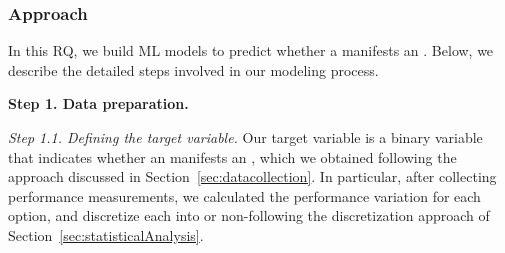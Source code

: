\subsubsection*{Approach}

In this RQ, we build ML models to predict whether a \instance manifests an \inconsistent. %
Below, we describe the detailed steps involved in our modeling process.

\noindent\textbf{Step 1. Data preparation.}

\textit{Step 1.1. Defining the target variable.} Our target variable is a binary variable that indicates whether an \instance manifests an \inconsistent, which we obtained following the approach discussed in Section~\ref{sec:datacollection}. In particular, after collecting performance measurements, we calculated the performance variation for each option, and discretize each \instance into \inconsistent or non-\inconsistent following the discretization approach of Section~\ref{sec:statisticalAnalysis}.


